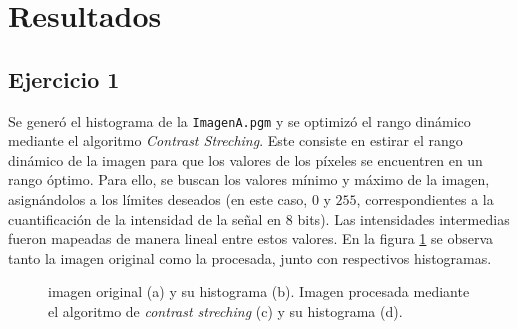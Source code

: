 \documentclass[11pt, twocolumn]{article}
\begin{document}
\section{Resultados}


\subsection*{Ejercicio 1}
Se generó el histograma de la \texttt{ImagenA.pgm} y se optimizó el rango dinámico mediante el algoritmo \textit{Contrast Streching}. Este consiste en estirar el rango dinámico de la imagen para que los valores de los píxeles se encuentren en un rango óptimo. Para ello, se buscan los valores mínimo y máximo de la imagen, asignándolos a los límites deseados (en este caso, $0$ y $255$, correspondientes a la cuantificación de la intensidad de la señal en $8$ bits). Las intensidades intermedias fueron mapeadas de manera lineal entre estos valores. En la figura \ref{fig:figuras_ej_1} se observa tanto la imagen original como la procesada, junto con respectivos histogramas.


\begin{figure}[htbp]
  \centering
  \hfill
  \hfill
  \hfill
  \hfill
  \caption{imagen original (a) y su histograma (b). Imagen procesada mediante el algoritmo de \textit{contrast streching} (c) y su histograma (d).}
  \label{fig:figuras_ej_1}
\end{figure}
\end{document}
